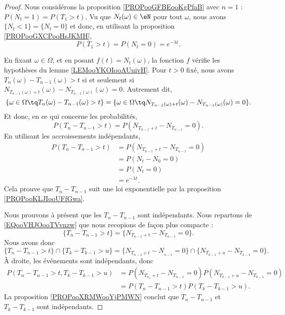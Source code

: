 \begin{proof}
	Nous considérons la proposition \ref{PROPooGFBEooKgPfaB} avec \( n=1\) : \( P(N_t=1)=P(T_1>t)\). Vu que \( N_t(\omega)\in \eN\) pour tout \( \omega\), nous avons \( \{ N_t<1 \}=\{ N_t=0 \}\) et donc, en utilisant la proposition \ref{PROPooGXCPooHsJKMH},
	\begin{equation}
		P(T_1>t)=P(N_t=0)=e^{-\lambda t}.
	\end{equation}

	En fixant \( \omega\in\Omega\), et en posant \( f(t)=N_t(\omega)\), la fonction \( f\) vérifie les hypothèses du lemme \ref{LEMooYKOIooAUuivH}. Pour \( t>0\) fixé, nous avons \( T_n(\omega)-T_{n-1}(\omega)>t\) si et seulement si \( N_{T_{n-1}(\omega)+t}(\omega)-N_{T_{n-1}(\omega)}(\omega)=0\). Autrement dit,
	\begin{equation}	\label{EQooVHJOooTVvnzw}
		\{ \omega\in \Omega\tq T_n(\omega)-T_{n-1}(\omega)>t \}=\{ \omega\in\Omega\tq N_{T_{n-1}(\omega)+t}(\omega)-N_{T_{n-1}(\omega)}(\omega)=0 \}.
	\end{equation}
	Et donc, en ce qui concerne les probabilités,
	\begin{equation}
		P(T_n-T_{n-1}>t)=P(N_{T_{n-1}+t}-N_{T_{n-1}}=0).
	\end{equation}
	En utilisant les accroissements indépendants,
	\begin{subequations}
		\begin{align}
			P(T_n-T_{n-1}>t) & = P(N_{T_{n-1}+t}-N_{T_{n-1}}=0) \\
			                 & =P(N_t-N_0=0)                    \\
			                 & =P(N_t=0)                        \\
			                 & =e^{-\lambda t}.
		\end{align}
	\end{subequations}
	Cela prouve que \( T_n-T_{n-1}\) suit une loi exponentielle par la proposition \ref{PROPooKLJIooUFfGwa}.

	Nous prouvons à présent que les \( T_n-T_{n-1}\) sont indépendants. Nous repartons de \eqref{EQooVHJOooTVvnzw} que nous recopions de façon plus compacte :
	\begin{equation}
		\{ T_n-T_{n-1}>t \}=\{ N_{T_{n-1}+t}-N_{T_{n-1}}=0 \}.
	\end{equation}
	Nous avons donc
	\begin{equation}
		\{ T_{n}-T_{n-1}>t \}\cap\{ T_k-T_{k-1}>u \}=\{ N_{T_{n-1}+t}-N_{_{n-1}}=0 \}\cap \{ N_{T_{k-1}+u}-N_{T_{k-1}}=0 \}.
	\end{equation}
	À droite, les événements sont indépendants, donc
	\begin{subequations}
		\begin{align}
			P(T_n-T_{n-1}>t, T_k-T_{k-1}>u) & =P(N_{T_{n_1}+t}-N_{T_{n-1}}=0)P(N_{T_{k-1}+u}-N_{T_{k-1}}=0) \\
			                                & =P(T_n-T_{n-1}>t)P(T_k-T_{k-1}>u).
		\end{align}
	\end{subequations}
	La proposition \ref{PROPooXRMWooYjPMWN} conclut que \( T_{n}-T_{n-1}\) et \( T_k-T_{k-1}\) sont indépendants.
\end{proof}

